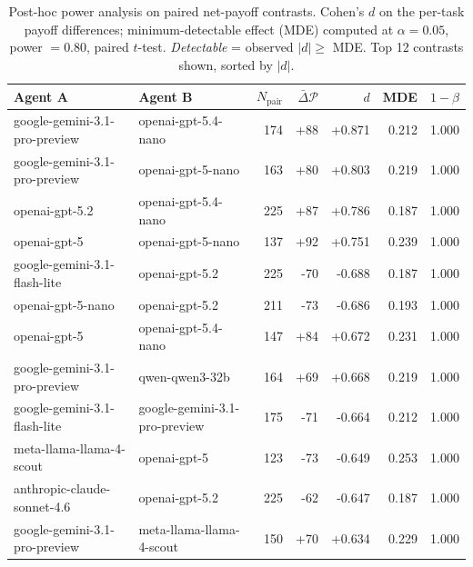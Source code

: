 \begin{table}[t]\centering\small
\caption{Post-hoc power analysis on paired net-payoff contrasts. Cohen's $d$ on the per-task payoff differences; minimum-detectable effect (MDE) computed at $\alpha = 0.05$, power $= 0.80$, paired $t$-test. \emph{Detectable} = observed $|d| \ge $ MDE. Top 12 contrasts shown, sorted by $|d|$.}
\label{tab:power-analysis}
\begin{tabular}{llrrrrr}
\toprule
Agent A & Agent B & $N_{\text{pair}}$ & $\bar{\Delta}\mathcal{P}$ & $d$ & MDE & $1-\beta$ \\
\midrule
google-gemini-3.1-pro-preview & openai-gpt-5.4-nano & 174 & +88 & +0.871 & 0.212 & 1.000 \\
google-gemini-3.1-pro-preview & openai-gpt-5-nano & 163 & +80 & +0.803 & 0.219 & 1.000 \\
openai-gpt-5.2 & openai-gpt-5.4-nano & 225 & +87 & +0.786 & 0.187 & 1.000 \\
openai-gpt-5 & openai-gpt-5-nano & 137 & +92 & +0.751 & 0.239 & 1.000 \\
google-gemini-3.1-flash-lite & openai-gpt-5.2 & 225 & -70 & -0.688 & 0.187 & 1.000 \\
openai-gpt-5-nano & openai-gpt-5.2 & 211 & -73 & -0.686 & 0.193 & 1.000 \\
openai-gpt-5 & openai-gpt-5.4-nano & 147 & +84 & +0.672 & 0.231 & 1.000 \\
google-gemini-3.1-pro-preview & qwen-qwen3-32b & 164 & +69 & +0.668 & 0.219 & 1.000 \\
google-gemini-3.1-flash-lite & google-gemini-3.1-pro-preview & 175 & -71 & -0.664 & 0.212 & 1.000 \\
meta-llama-llama-4-scout & openai-gpt-5 & 123 & -73 & -0.649 & 0.253 & 1.000 \\
anthropic-claude-sonnet-4.6 & openai-gpt-5.2 & 225 & -62 & -0.647 & 0.187 & 1.000 \\
google-gemini-3.1-pro-preview & meta-llama-llama-4-scout & 150 & +70 & +0.634 & 0.229 & 1.000 \\
\bottomrule
\end{tabular}
\end{table}